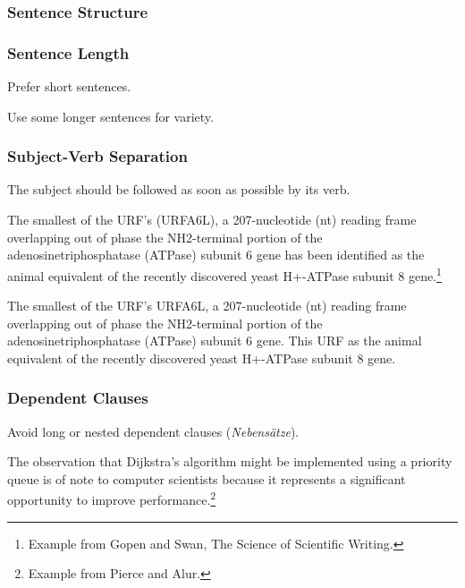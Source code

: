 \subsubsection{Sentence Structure}

\begin{frame}
  \frametitle{Sentence Length}

  Prefer short sentences.

  \medskip

  Use some longer sentences for variety.
\end{frame}

\begin{frame}
  \frametitle{Subject-Verb Separation}

  The subject should be followed as soon as possible by its verb.

  \medskip
  \pause


  {
    \small
    The smallest of the URF's (URFA6L), a 207-nucleotide (nt) reading frame overlapping out of phase the NH2-terminal portion of the adenosinetriphosphatase (ATPase) subunit 6 gene has been identified as the animal equivalent of the recently discovered yeast H+-ATPase subunit 8 gene.\footnote{Example from Gopen and Swan, The Science of Scientific Writing.}
  }

  \medskip
  \pause


  {
    \small
    The smallest of the URF's  URFA6L, a 207-nucleotide (nt) reading frame overlapping out of phase the NH2-terminal portion of the adenosinetriphosphatase (ATPase) subunit 6 gene.
    This URF  as the animal equivalent of the recently discovered yeast H+-ATPase subunit 8 gene.
  }
\end{frame}

\begin{frame}
  \frametitle{Dependent Clauses}

  Avoid long or nested dependent clauses (\emph{Nebensätze}).

  \medskip
  \pause


  {
    \small
    The observation that Dijkstra’s algorithm might be implemented using a priority queue is of note to computer scientists because it represents a significant opportunity to improve performance.\footnote{Example from Pierce and Alur.}
  }

  \medskip
  \pause

\end{frame}


